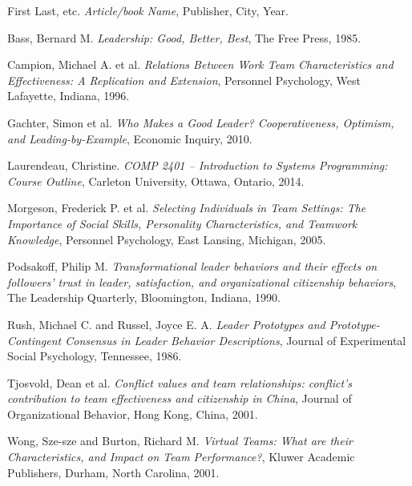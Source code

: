 \documentclass[12pt,letterpaper]{article}
\begin{document}
\begin{thebibliography}{16}

First Last, etc.
{\it Article/book Name},
Publisher, City, Year.

Bass, Bernard M.
{\it Leadership: Good, Better, Best},
The Free Press, 1985.

Campion, Michael A. et al.
{\it Relations Between Work Team Characteristics and Effectiveness: A Replication and Extension},
Personnel Psychology, West Lafayette, Indiana, 1996.

Gachter, Simon et al.
{\it Who Makes a Good Leader? Cooperativeness, Optimism, and Leading-by-Example},
Economic Inquiry, 2010.

Laurendeau, Christine.
{\it COMP 2401 -- Introduction to Systems Programming: Course Outline},
Carleton University, Ottawa, Ontario, 2014.

Morgeson, Frederick P. et al.
{\it Selecting Individuals in Team Settings: The Importance of Social Skills, Personality Characteristics, and Teamwork Knowledge},
Personnel Psychology, East Lansing, Michigan, 2005.

Podsakoff, Philip M.
{\it Transformational leader behaviors and their effects on followers' trust in leader, satisfaction, and organizational citizenship behaviors},
The Leadership Quarterly, Bloomington, Indiana, 1990.

Rush, Michael C. and Russel, Joyce E. A.
{\it Leader Prototypes and Prototype-Contingent Consensus in Leader Behavior Descriptions},
Journal of Experimental Social Psychology, Tennessee, 1986.

Tjosvold, Dean et al.
{\it Conflict values and team relationships: conflict's contribution to team effectiveness and citizenship in China},
Journal of Organizational Behavior, Hong Kong, China, 2001.

Wong, Sze-sze and Burton, Richard M.
{\it Virtual Teams: What are their Characteristics, and Impact on Team Performance?},
Kluwer Academic Publishers, Durham, North Carolina, 2001.

\end{thebibliography}
\end{document}
